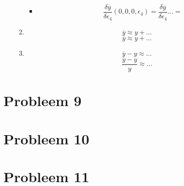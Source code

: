 \documentclass[12pt,a4paper]{article}
\begin{document}
\begin{enumerate}[(a)]
\begin{enumerate}[1.]
\begin{itemize}
\item
\[
\frac{\delta\overline{y}}{\delta\epsilon_4}(0,0,0,\epsilon_4)
= \frac{\delta\overline{y}}{\delta\epsilon_4}
...
= 
\]
\end{itemize}
\item
\[
\overline{y} \approx y +
...
\]
\[
\overline{y} \approx y +
...
\]
\item
\[
\overline{y} - y \approx 
...
\]
\[
\frac{\overline{y}-y}{y} \approx 
...
\]
\end{enumerate}

\end{enumerate}

\section{Probleem 9}
\section{Probleem 10}
\section{Probleem 11}
\end{document}

